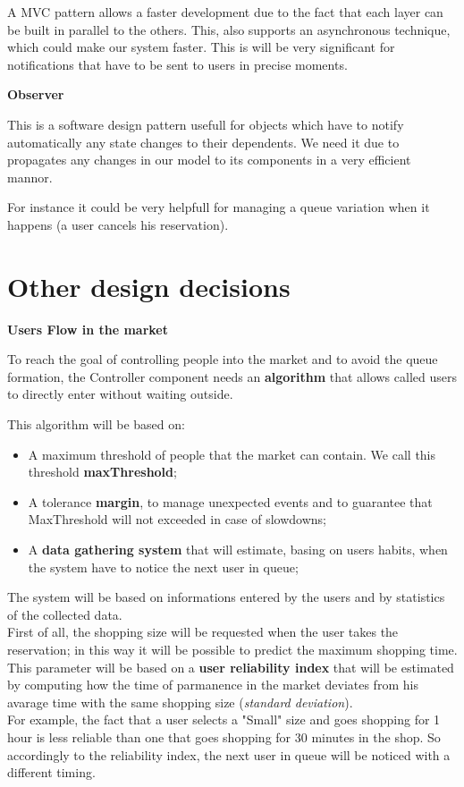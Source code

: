 A MVC pattern allows a faster development due to the fact that each layer can be built in parallel to the others. This, also supports an asynchronous technique, which could make our system faster. This is will be very significant for notifications that have to be sent to users in precise moments.\\
\par
\textbf{Observer} \par
This is a software design pattern usefull for objects which have to notify automatically any state changes to their dependents. We need it due to propagates any changes in our model to its components in a very efficient mannor.

For instance it could be very helpfull for managing a queue variation when it happens (a user cancels his reservation).


\section{Other design decisions}
\textbf{Users Flow in the market} \par
To reach the goal of controlling people into the market and to avoid the queue formation, the Controller component needs an \textbf{algorithm} that allows called users to directly enter without waiting outside. 

This algorithm will be based on:
\begin{itemize}
\item A maximum threshold of people that the market can contain. We call this threshold \textbf{maxThreshold};
\item A tolerance \textbf{margin}, to manage unexpected events and to guarantee that MaxThreshold will not  exceeded in case of slowdowns;
\item A \textbf{data gathering system} that will estimate, basing on users habits, when the system have to notice the next user in queue;
\end{itemize}


The system will be based on informations entered by the users and by statistics of the collected data.\\
First of all, the shopping size will be requested when the user takes the reservation; in this way it will be possible to predict the maximum shopping time. 
This parameter will be based on a \textbf{user reliability index} that will be estimated by computing how the time of parmanence in the market deviates from his avarage time with the same shopping size (\textit{standard deviation}).  \\
For example, the fact that a user selects a "Small" size and goes shopping for 1 hour is less reliable than one that goes shopping for 30 minutes in the shop.
So accordingly to the reliability index, the next user in queue will be noticed with a different timing.

